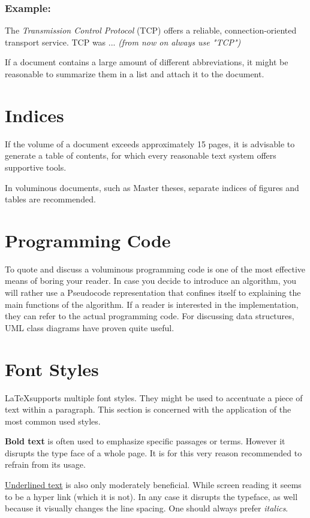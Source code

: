     \begin{example}
      \subsubsection*{Example:}
      The \emph{Transmission Control Protocol} (TCP) offers a reliable,
      connection-oriented transport service. TCP was ... \emph{(from now on
      always use "TCP")}
    \end{example}

If a document contains a large amount of different abbreviations, it might be
reasonable to summarize them in a list and attach it to the document.

\section{Indices}
If the volume of a document exceeds approximately 15 pages, it is advisable to generate a table of contents, for which every reasonable text system offers supportive tools.

In voluminous documents, such as Master theses, separate indices of figures and tables are recommended.

\section{Programming Code}
To quote and discuss a voluminous programming code is one of the most effective
means of boring your reader.
In case you decide to introduce an algorithm, you  will rather use a Pseudocode
representation that confines itself to explaining  the main functions of the
algorithm.
If a reader is interested in the implementation, they can refer to the actual
programming code.
For discussing data structures, UML class diagrams have proven quite useful.

\section{Font Styles}
\LaTeX supports multiple font styles.
They might be used to accentuate a piece of text within a paragraph.
This section is concerned with the application of the most common used styles.

\textbf{Bold text} is often used to emphasize specific passages or terms.
However it disrupts the type face of a whole page.
It is for this very reason recommended to refrain from its usage.

\underline{Underlined text} is also only moderately beneficial.
While screen reading it seems to be a hyper link (which it is not).
In any case it disrupts the typeface, as well because it visually changes
the line spacing.
One should always prefer \textit{italics}.

